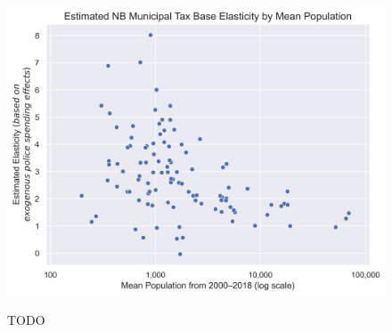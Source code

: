 \begin{figure}[H]
    \centering
    \includegraphics[width=6in]{../data_visualization/elasticity.png}
    \\[-0.5cm]
    \caption{TODO}
\end{figure}